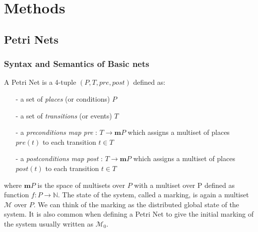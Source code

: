 
\chapter{Methods}
\label{chap:methods}
\ifpdf
    \graphicspath{{Chapter2/Figs/Raster/}{Chapter2/Figs/PDF/}{Chapter2/Figs/}}
\else
    \graphicspath{{Chapter2/Figs/Vector/}{Chapter2/Figs/}}
\fi



\section{Petri Nets}
\subsection{Syntax and Semantics of Basic nets}
A Petri Net is a 4-tuple $(P, T, pre, post)$ defined as:
\begin{itemize}
\item[-] a set of \textit{places} (or conditions) $P$
\item[-] a set of \textit{transitions} (or events) $T$
\item[-] a \textit{preconditions map pre} : $T \rightarrow \mathbf{m}P$ which assigns a multiset of places $pre(t)$ to each transition $t \in T$
\item[-] a \textit{postconditions map post} : $T \rightarrow \mathbf{m}P$ which assigns a multiset of places $post(t)$ to each transition $t \in T$
\end{itemize}
where $\mathbf{m}P$ is the space of multisets over $P$ with a multiset
over P defined as function $f: P \rightarrow \mathbb{N}$. The state of
the system, called a marking, is again a multiset $\mathcal{M}$ over
$P$. We can think of the marking as the distributed global state of
the system. It is also common when defining a Petri Net to give the initial marking of the system usually written as $\mathcal{M}_0$.

